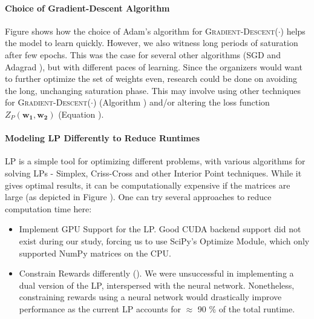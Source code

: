 \documentclass[12pt]{article}
\newcommand{\matr}[1]{\mathbf{#1}}  %
\begin{document}
    \paragraph{Choice of Gradient-Descent Algorithm} Figure  shows how the choice of Adam's algorithm \cite{Adam} for \textsc{Gradient-Descent}($\cdot$) helps the model to learn quickly. However, we also witness long periods of saturation after few epochs. This was the case for several other algorithms (SGD \cite{SGD} and Adagrad \cite{Adagrad}), but with different paces of learning. Since the organizers would want to further optimize the set of weights even, research could be done on avoiding the long, unchanging saturation phase. This may involve using other techniques for \textsc{Gradient-Descent}($\cdot$) (Algorithm ) and/or altering the loss function $Z_P(\matr{w_1}, \matr{w_2})$ (Equation ).
    
    \paragraph{Modeling LP Differently to Reduce Runtimes} LP is a simple tool for optimizing different problems, with various algorithms for solving LPs - Simplex, Criss-Cross and other Interior Point techniques. While it gives optimal results, it can be computationally expensive if the matrices are large (as depicted in Figure ). One can try several approaches to reduce computation time here:
    \begin{itemize}
        \item Implement GPU Support for the LP. Good CUDA backend support did not exist during our study, forcing us to use SciPy's Optimize Module, which only supported NumPy matrices on the CPU.
        \item Constrain Rewards differently (). We were unsuccessful in implementing a dual version of the LP, interspersed with the neural network. Nonetheless, constraining rewards using a neural network would drastically improve performance as the current LP accounts for $\approx$ 90 \% of the total runtime.
    \end{itemize}

    
    
    
    \cleardoublepage
    
\end{document}
